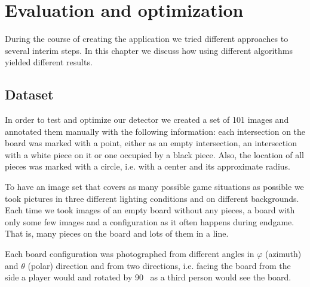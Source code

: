 
\chapter{Evaluation and optimization}
	\label{evaluation}
	During the course of creating the application we tried different approaches to several interim steps. In this chapter we discuss how using different algorithms yielded different results.

	\section{Dataset}
	\label{evaluation-dataset}
	In order to test and optimize our detector we created a set of 101 images and annotated them manually with the following information: each intersection on the board was marked with a point, either as an empty intersection, an intersection with a white piece on it or one occupied by a black piece. Also, the location of all pieces was marked with a circle, i.e. with a center and its approximate radius.

	To have an image set that covers as many possible game situations as possible we took pictures in three different lighting conditions and on different backgrounds. Each time we took images of an empty board without any pieces, a board with only some few images and a configuration as it often happens during endgame. That is, many pieces on the board and lots of them in a line.

	Each board configuration was photographed from different angles in $\varphi$ (azimuth) and $\theta$ (polar) direction and from two directions, i.e. facing the board from the side a player would and rotated by 90\textdegree~ as a third person would see the board.

